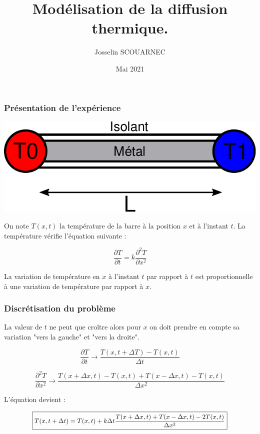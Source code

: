 \documentclass{beamer}
\title{Modélisation de la diffusion thermique.}
\author{Josselin SCOUARNEC}
\date{Mai 2021}
\begin{document}
    \maketitle


    \begin{frame}
    \frametitle{Présentation de l'expérience}

    \begin{center}
    \includegraphics[width=0.6\linewidth]{figs/schem.pdf}
    \end{center}

    On note $T(x, t)$ la température de la barre à la position $x$ et à l'instant $t$. La température vérifie l'équation suivante :

    $$\frac{\partial T}{\partial t } = k\frac{\partial^2 T}{\partial x^2 }$$

    La variation de température en $x$ à l'instant $t$ par rapport à $t$ est proportionnelle à une variation de température par rapport à $x$.


    \end{frame}

    \begin{frame}
    \frametitle{Discrétisation du problème}

    La valeur de $t$ ne peut que croître alors pour $x$ on doit prendre en compte sa variation "vers la gauche" et "vers la droite".

    \bigskip

    $$\frac{\partial T}{\partial t } \longrightarrow \frac{T(x, t + \Delta T) - T(x, t)}{\Delta t }$$


   	$$\frac{\partial^2 T}{\partial x^2} \longrightarrow \frac{T(x+ \Delta x, t)-T(x, t) + T(x-\Delta x, t) -T(x, t)}{\Delta x ^2 }$$

    \bigskip

    L'équation devient :

    $$\small\boxed{T(x, t + \Delta t) = T(x, t) + k \Delta t \frac{T(x+ \Delta x, t) + T(x-\Delta x, t) -2T(x, t)}{\Delta x ^2 }}$$


    \end{frame}
\end{document}
